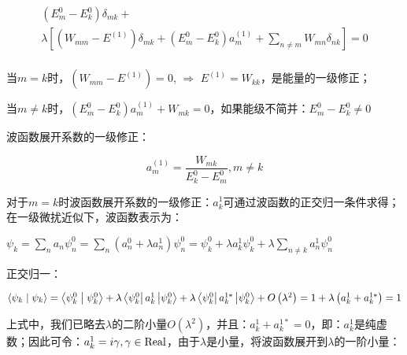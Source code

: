 \begin{equation}\label{22-9}
\begin{array}{c}
\left( {E_m^0  - E_k^0 } \right)\delta _{mk}  + \\
\lambda \left[ {\left( {W_{mm}  - E^{(1)} } \right)\delta _{mk}  + \left( {E_m^0  - E_k^0 } \right)a_m^{(1)}  + \sum\limits_{n \ne m} {W_{mn} \delta _{nk} } } \right] = 0 \\
\end{array}
\end{equation}

当$m = k$时，$\left( {W_{mm}  - E^{(1)} } \right) = 0$, $\Rightarrow$
$E^{(1)}  = W_{kk} $，是能量的一级修正；

当$m \ne k$时，$\left( {E_m^0  - E_k^0 } \right)a_m^{(1)}  + W_{mk}  = 0$，如果能级不简并：$E_m^0  - E_k^0  \ne 0$

波函数展开系数的一级修正：

\begin{equation}
a_m^{(1)}  = \frac{{W_{mk} }}{{E_k^0  - E_m^0 }}, m \ne k
\end{equation}

对于$m = k$时波函数展开系数的一级修正：$a_k^1 $可通过波函数的正交归一条件求得；
在一级微扰近似下，波函数表示为：

\begin{center}
$\psi _k  = \sum\limits_n {a_n \psi _n^0 }  = \sum\limits_n {\left( {a_n^0  + \lambda a_n^1 } \right)\psi _n^0 }  = \psi _k^0  + \lambda a_k^1 \psi _k^0  + \lambda \sum\limits_{n \ne k} {a_n^1 \psi _n^0 } $
\end{center}

正交归一：

\begin{center}
$\left\langle {{\psi _k }}
 \mathrel{\left | {\vphantom {{\psi _k } {\psi _k }}}
 \right. \kern-\nulldelimiterspace}
 {{\psi _k }} \right\rangle  = \left\langle {{\psi _k^0 }}
 \mathrel{\left | {\vphantom {{\psi _k^0 } {\psi _k^0 }}}
 \right. \kern-\nulldelimiterspace}
 {{\psi _k^0 }} \right\rangle  + \lambda \left\langle {\psi _k^0 } \right|a_k^1 \left| {\psi _k^0 } \right\rangle  + \lambda \left\langle {\psi _k^0 } \right|a_k^{1*} \left| {\psi _k^0 } \right\rangle  + O\left( {\lambda ^2 } \right) = 1 + \lambda \left( {a_k^1  + a_k^{1*} } \right) = 1$
\end{center}

上式中，我们已略去$\lambda$的二阶小量$O\left( {\lambda ^2 } \right)$，并且：$a_k^1  + a_k^{1*}  = 0$，即：$a_k^1 $是纯虚数；因此可令：$a_k^1  = i\gamma ,\gamma  \in {\rm{Real}}$，由于$\lambda$是小量，将波函数展开到$\lambda$的一阶小量：

